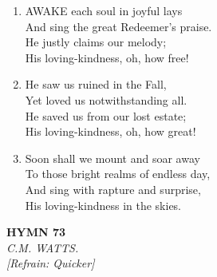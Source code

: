 \documentclass[11pt,a4paper]{article}
\begin{document}
\begin{enumerate}
    \item AWAKE each soul in joyful lays \\
        And sing the great Redeemer's praise. \\
        He justly claims our melody; \\
        His loving-kindness, oh, how free!

    \item He saw us ruined in the Fall, \\
        Yet loved us notwithstanding all. \\
        He saved us from our lost estate; \\
        His loving-kindness, oh, how great!

    \item Soon shall we mount and soar away \\
        To those bright realms of endless day, \\
        And sing with rapture and surprise, \\
        His loving-kindness in the skies.

\end{enumerate}

\newpage
\begin{center}
    {\Large \textbf{HYMN 73}}
    \\
    \textit{C.M. WATTS.}
    \\
    \textit{\small [Refrain: Quicker]}
\end{center}
\vspace{1em}
\end{document}
